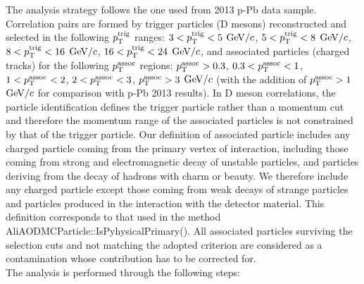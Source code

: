 The analysis strategy follows the one used from 2013 p-Pb data sample. Correlation pairs are formed by
trigger particles (D mesons) reconstructed and selected in the following $p_{\rm T}^{\rm trig}$ ranges: $3<p_{\rm T}^{\rm trig}<5$ $\mathrm{GeV}/c$, $5<p_{\rm T}^{\rm trig}<8$ $\mathrm{GeV}/c$, $8<p_{\rm T}^{\rm trig}<16$ $\mathrm{GeV}/c$, $16<p_{\rm T}^{\rm trig}<24$ $\mathrm{GeV}/c$, and associated particles (charged tracks) for the following $p_{\rm T}^{\rm assoc}$ regions: $p_{\rm T}^{\rm assoc}>0.3$, $0.3<p_{\rm T}^{\rm assoc}<1$, $1<p_{\rm T}^{\rm assoc}<2$, $2<p_{\rm T}^{\rm assoc}<3$, $p_{\rm T}^{\rm assoc}>3$ $\mathrm{GeV}/c$ (with the addition of $p_{\rm T}^{\rm assoc}>1$ $\mathrm{GeV}/c$ for comparison with p-Pb 2013 results). In D meson correlations, the particle identification
defines the trigger particle rather than a momentum cut and therefore the momentum range of the associated particles is not constrained by that of the trigger particle. Our definition of associated particle includes any charged particle coming from the primary vertex of interaction, including
those coming from strong and electromagnetic decay of unstable particles, and particles deriving from the
decay of hadrons with charm or beauty.
We therefore include any charged particle except those coming from weak decays of strange particles and particles produced in the interaction with the detector material. This definition corresponds to that used in the method AliAODMCParticle::IsPyhysicalPrimary().
All associated particles surviving the selection cuts and not matching the adopted criterion are considered as a contamination whose contribution has to be corrected for. \\

The analysis is performed through the following steps:

